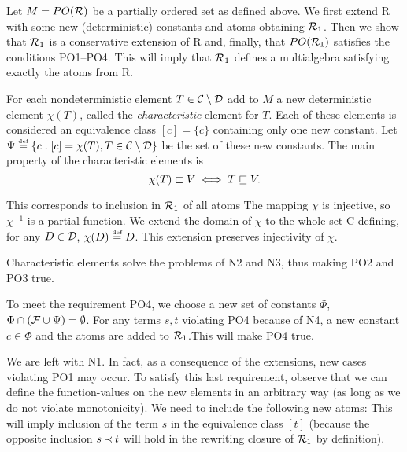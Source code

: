 \begin{PROOF}
Let \(M=PO(\mbox{$\cal R$})\) be a partially ordered set as defined above. We first extend
\C R with some new (deterministic) constants and atoms obtaining \(\mbox{$\cal R$}_1\). Then
we show that \(\mbox{$\cal R$}_1\) is a conservative extension of \C R and, finally, that
\(PO(\mbox{$\cal R$}_1)\) satisfies the conditions PO1--PO4. This will imply that 
\(\mbox{$\cal R$}_1\) defines a multialgebra satisfying exactly the atoms from \C R.

For each nondeterministic element
\(T\in\mbox{$\cal C$}\setminus \mbox{$\cal D$}\) add to $M$ a new deterministic element \(\chi(T)\), 
called the {\em characteristic} element for $T$. Each of these elements is 
considered an
equivalence class \([c]=\{c\}\) containing only one new constant. Let \(\Psi\mathrel{\stackrel{\mbox{\tiny def}}{=}}
\{c: [c]=\chi(T), T\in\mbox{$\cal C$}\setminus\mbox{$\cal D$}\}\) be the set of these new constants. 
The main
property of the characteristic elements is
\begin{equation} \label{eq:charact-constant}
\chi(T)\sqsubset V\iff T\sqsubseteq V.
\end{equation}

This corresponds to inclusion in \(\mbox{$\cal R$}_1\) of all atoms
The mapping \(\chi\) is injective, so \(\chi^{-1}\) is a partial function. We
extend the domain of \(\chi\) to the whole set \C C defining, for any \(D\in\mbox{$\cal D$}\),
\(\chi(D)\mathrel{\stackrel{\mbox{\tiny def}}{=}} D\). This extension preserves injectivity of \(\chi\).

Characteristic elements solve the problems of N2 and N3, thus making
PO2 and PO3 true. 

To meet the requirement PO4, we choose a new set of constants \(\Phi\),
\(\Phi\cap({\cal F}\cup\Psi)=\emptyset\). 
For any terms \(s,t\) violating PO4 because of N4, a new constant \(c\in\Phi\)
and the atoms
are added to \(\mbox{$\cal R$}_1\).This will make PO4 true.

We are left with N1. In fact, as a consequence of the extensions, new cases
violating PO1 may occur. To satisfy this last requirement, observe that
we can define the function-values on the new elements in an arbitrary way
(as long as we do not violate monotonicity). We need to include the following
 new atoms:
This will imply inclusion of the term $s$ in the
equivalence class $[t]$ (because the opposite inclusion \(s\mathbin{\prec} t\) will hold
in the rewriting closure of \(\mbox{$\cal R$}_1\) by definition).


\end{PROOF}

